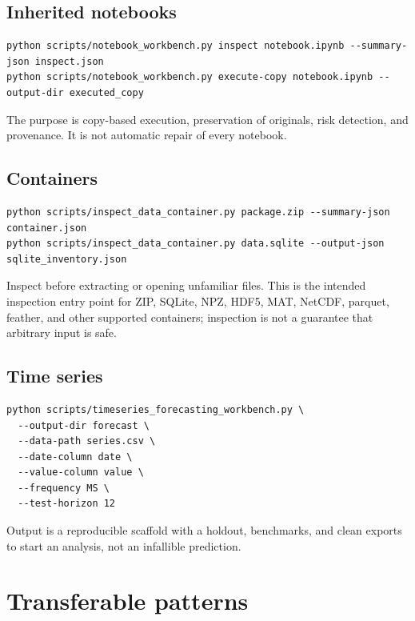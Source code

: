 \documentclass[11pt,a4paper]{article}
\begin{document}
\subsection{Inherited notebooks}
\begin{lstlisting}[style=promptstyle]
python scripts/notebook_workbench.py inspect notebook.ipynb --summary-json inspect.json
python scripts/notebook_workbench.py execute-copy notebook.ipynb --output-dir executed_copy
\end{lstlisting}
The purpose is copy-based execution, preservation of originals, risk
detection, and provenance. It is not automatic repair of every notebook.

\subsection{Containers}
\begin{lstlisting}[style=promptstyle]
python scripts/inspect_data_container.py package.zip --summary-json container.json
python scripts/inspect_data_container.py data.sqlite --output-json sqlite_inventory.json
\end{lstlisting}
Inspect before extracting or opening unfamiliar files. This is the intended
inspection entry point for ZIP, SQLite, NPZ, HDF5, MAT, NetCDF, parquet,
feather, and other supported containers; inspection is not a guarantee
that arbitrary input is safe.

\subsection{Time series}
\begin{lstlisting}[style=promptstyle]
python scripts/timeseries_forecasting_workbench.py \
  --output-dir forecast \
  --data-path series.csv \
  --date-column date \
  --value-column value \
  --frequency MS \
  --test-horizon 12
\end{lstlisting}
Output is a reproducible scaffold with a holdout, benchmarks, and clean
exports to start an analysis, not an infallible prediction.

\section{Transferable patterns}
\end{document}
